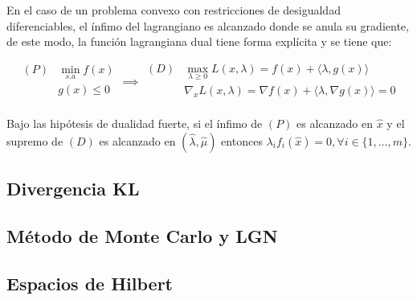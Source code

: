 En el caso de un problema convexo con restricciones de desigualdad diferenciables, el ínfimo del lagrangiano es alcanzado donde se anula su gradiente, de este modo, la función lagrangiana dual tiene forma explícita y se tiene que:

\begin{equation*}
	\begin{aligned}
		(P) & \min_{s.a} f(x)\\
		& g(x) \leq 0\\
	\end{aligned} \implies
	\begin{aligned}
		(D) & \max_{\lambda\geq 0} L(x,\lambda)= f(x) + \langle\lambda,g(x)\rangle\\
		& \nabla_x L(x,\lambda) = \nabla f(x) + \langle\lambda,\nabla g(x)\rangle = 0\\
	\end{aligned}
\end{equation*}


\begin{theorem}
	Bajo las hipótesis de dualidad fuerte, si el ínfimo de $(P)$ es alcanzado en $\hat{x}$ y el supremo de $(D)$ es alcanzado en $(\hat{\lambda},\hat{\mu})$ entonces $\lambda_i f_i(\hat{x})=0, \forall i\in\{1,\ldots,m\}$.
\end{theorem}



\subsection{Divergencia KL}

\subsection{Método de Monte Carlo y LGN}

\subsection{Espacios de Hilbert}









